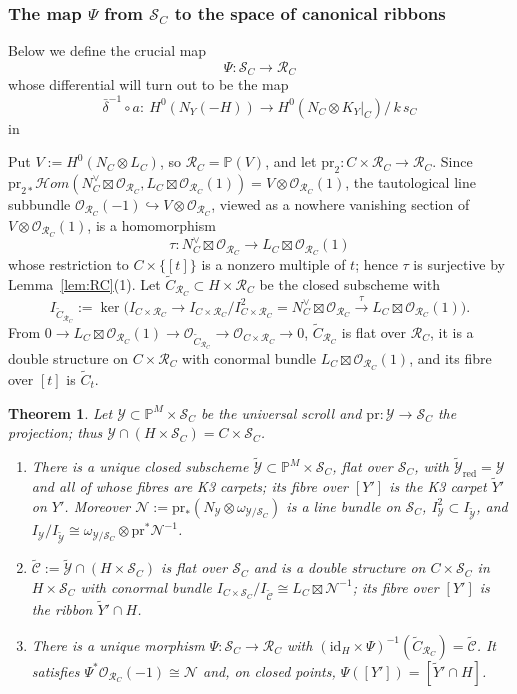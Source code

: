 \documentclass[11pt,reqno]{amsart}
\theoremstyle{plain}
\newtheorem{theorem}{Theorem}[section]
\theoremstyle{definition}
\newcommand{\PP}{\mathbb{P}}
\newcommand{\PM}{\mathbb{P}^M}
\newcommand{\OO}{\mathcal{O}}
\newcommand{\sHom}{\mathcal{H}om}
\newcommand{\id}{\mathrm{id}}
\newcommand{\Yt}{\widetilde{Y}}
\newcommand{\Ct}{\widetilde{C}}
\newcommand{\NY}{N_{Y}}
\newcommand{\SC}{\mathcal{S}_C}
\newcommand{\RC}{\mathcal{R}_C}
\newcommand{\cY}{\mathcal{Y}}
\newcommand{\cYt}{\widetilde{\mathcal{Y}}}
\newcommand{\cCt}{\widetilde{\mathcal{C}}}
\newcommand{\cN}{\mathcal{N}}
\newcommand{\pr}{\mathrm{pr}}
\begin{document}
\subsubsection*{The map $\Psi$ from $\mathcal{S}_C$ to the space of canonical ribbons}

Below we define the crucial map $$\Psi: \mathcal{S}_C \to \mathcal{R}_C$$ whose differential will turn out to be the map
\begin{equation*}
\bar\delta^{-1}\circ a\colon\ H^0(\NY(-H))\longrightarrow H^0(N_C\otimes K_Y|_C)\big/\,k\,s_C
\end{equation*}
in 

Put $V:=H^0(N_C\otimes L_C)$, so $\RC=\PP(V)$, and let $\pr_2\colon C\times\RC\to\RC$. Since $\pr_{2*}\sHom(N_C^{\vee}\boxtimes\OO_{\RC},L_C\boxtimes\OO_{\RC}(1))=V\otimes\OO_{\RC}(1)$, the tautological line subbundle $\OO_{\RC}(-1)\hookrightarrow V\otimes\OO_{\RC}$, viewed as a nowhere vanishing section of $V\otimes\OO_{\RC}(1)$, is a homomorphism
\begin{equation}\label{universal ribbon}
\tau\colon N_C^{\vee}\boxtimes\OO_{\RC}\longrightarrow L_C\boxtimes\OO_{\RC}(1)
\end{equation}
whose restriction to $C\times\{[t]\}$ is a nonzero multiple of $t$; hence $\tau$ is surjective by Lemma~\ref{lem:RC}(1). Let $\Ct_{\RC}\subset H\times\RC$ be the closed subscheme with
\[
I_{\Ct_{\RC}}:=\ker\big(I_{C\times\RC}\to I_{C\times\RC}/I_{C\times\RC}^2=N_C^{\vee}\boxtimes\OO_{\RC}\xrightarrow{\ \tau\ }L_C\boxtimes\OO_{\RC}(1)\big).
\]
From $0\to L_C\boxtimes\OO_{\RC}(1)\to\OO_{\Ct_{\RC}}\to\OO_{C\times\RC}\to0$, $\Ct_{\RC}$ is flat over $\RC$, it is a double structure on $C\times\RC$ with conormal bundle $L_C\boxtimes\OO_{\RC}(1)$, and its fibre over $[t]$ is $\Ct_t$.

\begin{theorem}\label{thm:Psi}
Let $\cY\subset\PM\times\SC$ be the universal scroll and $\pr\colon\cY\to\SC$ the projection; thus $\cY\cap(H\times\SC)=C\times\SC$.
\begin{enumerate}
\item There is a unique closed subscheme $\cYt\subset\PM\times\SC$, flat over $\SC$, with $\cYt_{\mathrm{red}}=\cY$ and all of whose fibres are K3 carpets; its fibre over $[Y']$ is the K3 carpet $\Yt'$ on $Y'$. Moreover $\cN:=\pr_*(N_{\cY}\otimes\omega_{\cY/\SC})$ is a line bundle on $\SC$, $I_{\cY}^2\subset I_{\cYt}$, and $I_{\cY}/I_{\cYt}\cong\omega_{\cY/\SC}\otimes\pr^*\cN^{-1}$.
\item $\cCt:=\cYt\cap(H\times\SC)$ is flat over $\SC$ and is a double structure on $C\times\SC$ in $H\times\SC$ with conormal bundle $I_{C\times\SC}/I_{\cCt}\cong L_C\boxtimes\cN^{-1}$; its fibre over $[Y']$ is the ribbon $\Yt'\cap H$.
\item There is a unique morphism $\Psi\colon\SC\to\RC$ with $(\id_H\times\Psi)^{-1}(\Ct_{\RC})=\cCt$. It satisfies $\Psi^*\OO_{\RC}(-1)\cong\cN$ and, on closed points, $\Psi([Y'])=[\Yt'\cap H]$.
\end{enumerate}
\end{theorem}
\end{document}
